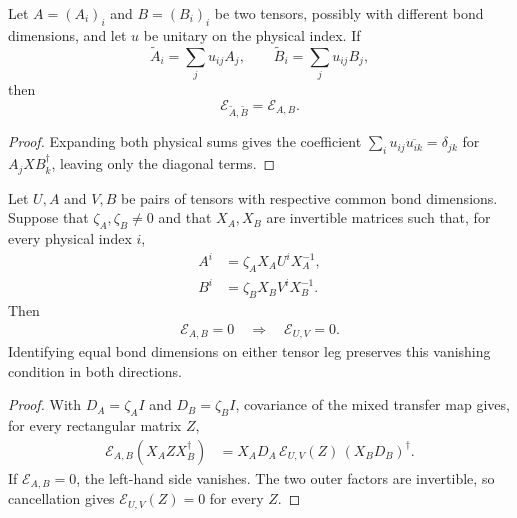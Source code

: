 \begin{lemma}
    \label{lem:mixed_transfer_common_physical_unitary}
    \leanok
    Let $A=(A_i)_i$ and $B=(B_i)_i$ be two tensors, possibly with
    different bond dimensions, and let $u$ be unitary on the physical index.
    If
    \[
        \widetilde A_i=\sum_j u_{ij}A_j,
        \qquad
        \widetilde B_i=\sum_j u_{ij}B_j,
    \]
    then
    \[
        \mathcal E_{\widetilde A,\widetilde B}
        =
        \mathcal E_{A,B}.
    \]
\end{lemma}

\begin{proof}
    \leanok
    Expanding both physical sums gives the coefficient
    $\sum_i u_{ij}\overline{u_{ik}}=\delta_{jk}$ for $A_jX B_k^\dagger$,
    leaving only the diagonal terms.
\end{proof}

\begin{lemma}
    \label{lem:mixed_transfer_gauge_phase_zero}
    \leanok
    Let $U,A$ and $V,B$ be pairs of tensors with respective common bond
    dimensions. Suppose that $\zeta_A,\zeta_B\ne 0$ and that $X_A,X_B$ are
    invertible matrices such that, for every physical index $i$,
    \begin{align}
        A^i & = \zeta_A X_A U^i X_A^{-1}, \\
        B^i & = \zeta_B X_B V^i X_B^{-1}.
    \end{align}
    Then
    \begin{align}
        \mathcal E_{A,B}=0
        \quad\Longrightarrow\quad
        \mathcal E_{U,V}=0.
    \end{align}
    Identifying equal bond dimensions on either tensor leg preserves this
    vanishing condition in both directions.
\end{lemma}

\begin{proof}
    \leanok
    With $D_A=\zeta_A I$ and $D_B=\zeta_B I$, covariance of the mixed transfer
    map gives, for every rectangular matrix $Z$,
    \begin{align}
        \mathcal E_{A,B}(X_A Z X_B^\dagger)
         & =
        X_A D_A\,\mathcal E_{U,V}(Z)\,(X_B D_B)^\dagger .
    \end{align}
    If $\mathcal E_{A,B}=0$, the left-hand side vanishes. The two outer
    factors are invertible, so cancellation gives
    $\mathcal E_{U,V}(Z)=0$ for every $Z$.
\end{proof}

